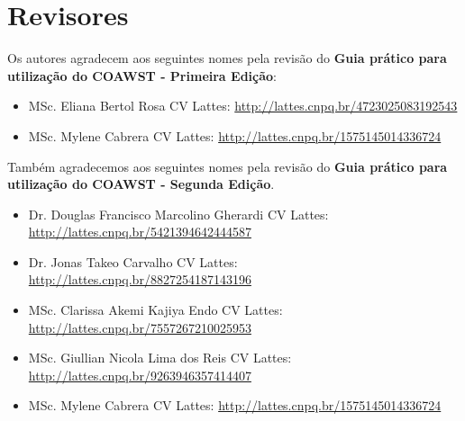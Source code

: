 
\chapter*{Revisores}

\bigskip
\noindent Os autores agradecem aos seguintes nomes pela revisão do \textbf{Guia prático para utilização do COAWST - Primeira Edição}:
\bigskip

\begin{itemize}
    \item MSc. Eliana Bertol Rosa \newline CV Lattes: \textcolor{bleu_cite}{\href{http://lattes.cnpq.br/4723025083192543}{http://lattes.cnpq.br/4723025083192543}}
    \bigskip
    \item MSc. Mylene Cabrera \newline CV Lattes: \textcolor{bleu_cite}{\href{http://lattes.cnpq.br/1575145014336724}{http://lattes.cnpq.br/1575145014336724}}
\end{itemize}

\bigskip
\bigskip
\noindent Também agradecemos aos seguintes nomes pela revisão do \textbf{Guia prático para utilização do COAWST - Segunda Edição}.
\bigskip

\begin{itemize}
    \item Dr. Douglas Francisco Marcolino Gherardi \newline CV Lattes: \textcolor{bleu_cite}{\href{http://lattes.cnpq.br/5421394642444587}{http://lattes.cnpq.br/5421394642444587}}
    \bigskip
    \item Dr. Jonas Takeo Carvalho \newline CV Lattes: \textcolor{bleu_cite}{\href{http://lattes.cnpq.br/8827254187143196}{http://lattes.cnpq.br/8827254187143196}}
    \bigskip
    \item MSc. Clarissa Akemi Kajiya Endo \newline CV Lattes: \textcolor{bleu_cite}{\href{http://lattes.cnpq.br/7557267210025953}{http://lattes.cnpq.br/7557267210025953}}
    \bigskip
    \item MSc. Giullian Nicola Lima dos Reis \newline CV Lattes: \textcolor{bleu_cite}{\href{http://lattes.cnpq.br/9263946357414407}{http://lattes.cnpq.br/9263946357414407}}
    \bigskip
    \item MSc. Mylene Cabrera \newline CV Lattes: \textcolor{bleu_cite}{\href{http://lattes.cnpq.br/1575145014336724}{http://lattes.cnpq.br/1575145014336724}}
\end{itemize}
